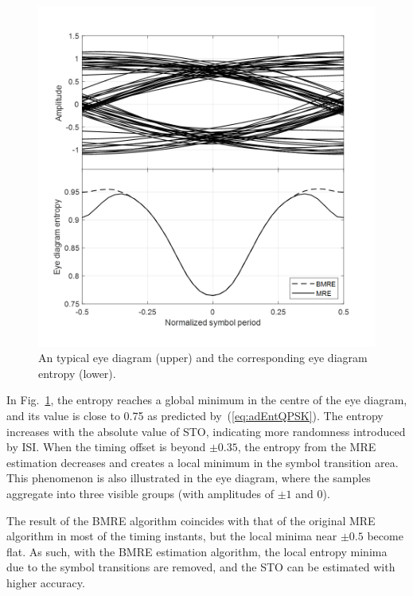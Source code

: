 \documentclass[12pt, draftclsnofoot, onecolumn]{IEEEtran}
\begin{document}
\begin{figure}[htbp]
\centering
\includegraphics[width=3.1 in]{pic/timing.png}
\caption{An typical eye diagram (upper) and the corresponding eye diagram entropy (lower).}
\label{fig:timing} 
\end{figure}

In Fig.~\ref{fig:timing}, the entropy reaches a global minimum in the centre of the eye diagram, and its value is close to 0.75 as predicted by~(\ref{eq:adEntQPSK}).
The entropy increases with the absolute value of STO, indicating  more randomness introduced by ISI.
When the timing offset is beyond $\pm 0.35$, the  entropy from the MRE estimation decreases and creates a local minimum in the symbol transition area. 
This phenomenon is also illustrated in the eye diagram, where the samples aggregate into three visible groups (with amplitudes of \(\pm 1\) and 0).

The result of the BMRE algorithm coincides with that of the original MRE algorithm in most of the timing instants, but the local minima near $\pm0.5$ become flat.
As such, with the BMRE estimation algorithm, the local entropy minima due to the symbol transitions are removed, and the STO can be estimated with higher accuracy.
\end{document}

